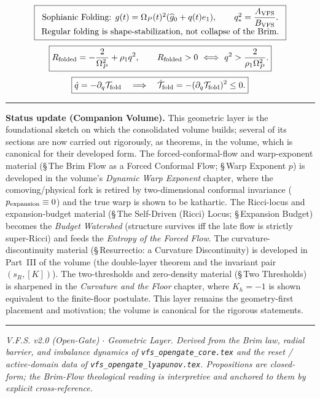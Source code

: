 \documentclass[11pt,a4paper]{article}
\newcommand{\Op}{\Omega_P}
\theoremstyle{plain}
\theoremstyle{remark}
\theoremstyle{definition}
\begin{document}
\[
\boxed{\begin{array}{c}
\text{Sophianic Folding: }g(t)=\Op(t)^2(\widehat g_0+q(t)e_1),\qquad
q_\ast^2=\dfrac{A_{\rm VFS}}{B_{\rm VFS}}.\\[3pt]
\text{Regular folding is shape-stabilization, not collapse of the Brim.}
\end{array}}
\]
\[
\boxed{R_{\rm folded}=-\frac{2}{\Op^2}+\rho_1q^2,
\qquad
R_{\rm folded}>0\ \Longleftrightarrow\ q^2>\frac{2}{\rho_1\Op^2}.}
\]
\[
\boxed{\dot q=-\partial_q\mathcal T_{\rm fold}
\quad\Longrightarrow\quad
\dot{\mathcal T}_{\rm fold}=-(\partial_q\mathcal T_{\rm fold})^2\le0.}
\]

\vspace{0.5em}
\hrule
\smallskip
\noindent\textbf{Status update (Companion Volume).}
This geometric layer is the foundational sketch on which the consolidated volume builds; several of its
sections are now carried out rigorously, as theorems, in the volume, which is canonical for their
developed form. The forced-conformal-flow and warp-exponent material (\S\,The Brim Flow as a Forced
Conformal Flow; \S\,Warp Exponent $p$) is developed in the volume's \emph{Dynamic Warp Exponent}
chapter, where the comoving/physical fork is retired by two-dimensional conformal invariance
($p_{\rm expansion}\equiv0$) and the true warp is shown to be kathartic. The Ricci-locus and
expansion-budget material (\S\,The Self-Driven (Ricci) Locus; \S\,Expansion Budget) becomes the
\emph{Budget Watershed} (structure survives iff the late flow is strictly super-Ricci) and feeds the
\emph{Entropy of the Forced Flow}. The curvature-discontinuity material (\S\,Resurrectio: a Curvature
Discontinuity) is developed in Part~III of the volume (the double-layer theorem and the invariant pair
$(s_R,[K])$). The two-thresholds and zero-density material (\S\,Two Thresholds) is sharpened in the
\emph{Curvature and the Floor} chapter, where $K_h=-1$ is shown equivalent to the finite-floor
postulate. This layer remains the geometry-first placement and motivation; the volume is canonical for
the rigorous statements.

\smallskip
\hrule
\smallskip
\noindent\footnotesize\raggedright\emph{V.F.S. v2.0 (Open-Gate) $\cdot$ Geometric Layer. Derived from the Brim
law, radial barrier, and imbalance dynamics of \texttt{vfs\_opengate\_core.tex} and the reset /
active-domain data of \texttt{vfs\_opengate\_lyapunov.tex}. Propositions are closed-form; the
Brim-Flow theological reading is interpretive and anchored to them by explicit cross-reference.}
\end{document}
